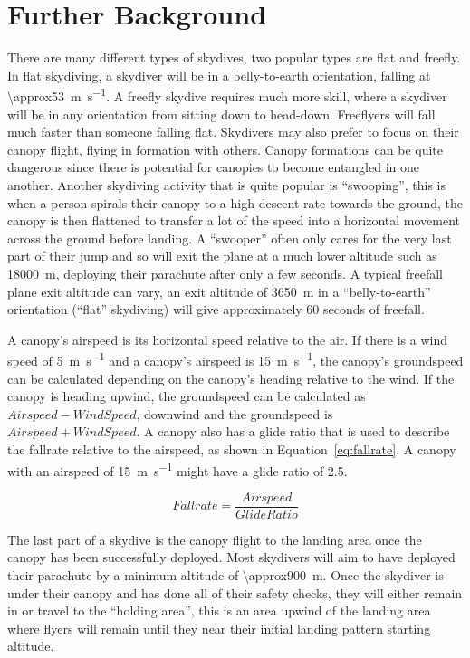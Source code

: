 \section{Further Background}\label{sec:further-background}
There are many different types of skydives, two popular types are flat and freefly. In flat skydiving, a skydiver will be in a belly-to-earth orientation, falling at \SI{\approx53}{\metre\per\second}. A freefly skydive requires much more skill, where a skydiver will be in any orientation from sitting down to head-down. Freeflyers will fall much faster than someone falling flat.
Skydivers may also prefer to focus on their canopy flight, flying in formation with others. Canopy formations can be quite dangerous since there is potential for canopies to become entangled in one another.
Another skydiving activity that is quite popular is ``swooping'', this is when a person spirals their canopy to a high descent rate towards the ground, the canopy is then flattened to transfer a lot of the speed into a horizontal movement across the ground before landing. A ``swooper'' often only cares for the very last part of their jump and so will exit the plane at a much lower altitude such as \SI{18000}{\metre}, deploying their parachute after only a few seconds.
A typical freefall plane exit altitude can vary, an exit altitude of \SI{3650}{\metre} in a ``belly-to-earth'' orientation (``flat'' skydiving) will give approximately 60 seconds of freefall.

A canopy's airspeed is its horizontal speed relative to the air. If there is a wind speed of \SI{5}{\metre\per\second} and a canopy's airspeed is \SI{15}{\metre\per\second}, the canopy's groundspeed can be calculated depending on the canopy's heading relative to the wind. If the canopy is heading upwind, the groundspeed can be calculated as $Airspeed - WindSpeed$, downwind and the groundspeed is $Airspeed + WindSpeed$.
A canopy also has a glide ratio that is used to describe the fallrate relative to the airspeed, as shown in Equation~\ref{eq:fallrate}. A canopy with an airspeed of \SI{15}{\metre\per\second} might have a glide ratio of 2.5.

\begin{equation}\label{eq:fallrate}
  Fallrate = \frac{Airspeed}{Glide Ratio}
\end{equation}

The last part of a skydive is the canopy flight to the landing area once the canopy has been successfully deployed. Most skydivers will aim to have deployed their parachute by a minimum altitude of \SI{\approx900}{\metre}.
Once the skydiver is under their canopy and has done all of their safety checks, they will either remain in or travel to the ``holding area'', this is an area upwind of the landing area where flyers will remain until they near their initial landing pattern starting altitude.

